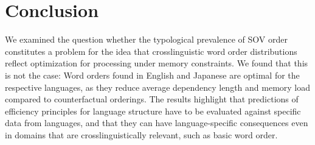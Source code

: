 \documentclass[11pt,a4paper]{article}
\begin{document}
\section{Conclusion}
We examined the question whether the typological prevalence of SOV order constitutes a problem for the idea that crosslinguistic word order distributions reflect optimization for processing under memory constraints.
We found that this is not the case: Word orders found in English and Japanese are optimal for the respective languages, as they reduce average dependency length and memory load compared to counterfactual orderings. %
The results highlight that predictions of efficiency principles for language structure have to be evaluated against specific data from languages, and that they can have language-specific consequences even in domains that are crosslinguistically relevant, such as basic word order.



%
\end{document}
